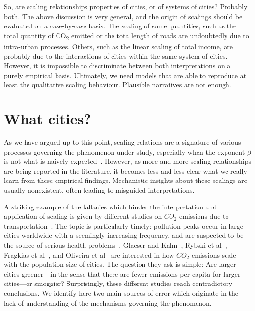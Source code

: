 So, are scaling relationships properties of cities, or of systems of cities?
Probably both. The above discussion is very general, and the origin of scalings
should be evaluated on a case-by-case basis. The scaling of some quantities,
such as the total quantity of CO\textsubscript{2} emitted or the tota length of
roads are undoubtedly due to intra-urban processes. Others, such as the linear
scaling of total income, are probably due to the interactions of cities within
the same system of cities. However, it is impossible to discriminate between
both interpretations on a purely empirical basis. Ultimately, we need models that are
able to reproduce at least the qualitative scaling behaviour. Plausible
narratives are not enough.


\section{What cities?}
\label{sec:what_cities_}

As we have argued up to this point, scaling relations are a signature
of various processes governing the phenomenon under study, especially when the exponent
$\beta$ is not what is naively expected~\cite{Barenblatt:2003}. However, as more and more scaling
relationships are being reported in the literature, it becomes less and less clear what we really
learn from these empirical findings. Mechanistic insights about these scalings are usually
nonexistent, often leading to misguided interpretations.


A striking example of the fallacies which hinder the interpretation and application
of scaling is given by different studies on $CO_2$ emissions due to transportation~\cite{Fragkias:2013,Glaeser:2010,Oliveira:2014,Rybski:2013}. The topic
is particularly timely: pollution peaks occur in large cities worldwide with a seemingly
increasing frequency, and are suspected to be the source of serious health problems~\cite{Bernstein:2004}. Glaeser and Kahn~\cite{Glaeser:2010}, Rybski et al~\cite{Rybski:2013}, Fragkias et al~\cite{Fragkias:2013}, and Oliveira et al~\cite{Oliveira:2014} are interested in how $CO_2$ emissions scale with the population size
of cities. The question they ask is simple: Are larger cities greener---in the sense that there
are fewer emissions per capita for larger cities---or smoggier? Surprisingly, these different
studies reach contradictory conclusions. We identify here two main sources of error which
originate in the lack of understanding of the mechanisms governing the phenomenon.


